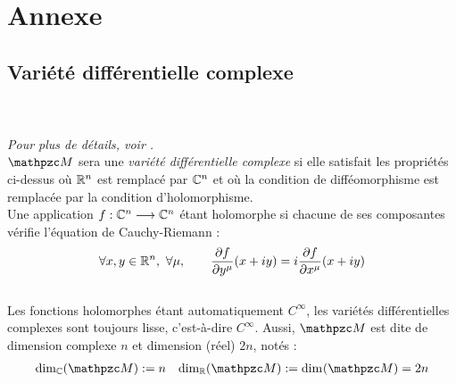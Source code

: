 \section{Annexe}

\subsection{\wip Variété différentielle complexe }\label{ann:VDC}

\\ \\
\textit{Pour plus de détails, voir \cite{nakahara_geometry_2003, ballmann_lectures_2006}.}
\\

$\manu$ sera une \emph{variété différentielle complexe} si elle satisfait les propriétés ci-dessus où $\mathbb{R}^n$ est remplacé par $\mathbb{C}^n$ et où la condition de difféomorphisme est remplacée par la condition d'holomorphisme. 
\\
Une application $f : \mathbb{C}^n\longrightarrow \mathbb{C}^n$ étant holomorphe si chacune de ses composantes vérifie l'équation de Cauchy-Riemann :
\[\forall x,y\in\R^n,\ \forall \mu,\qquad \frac{\partial f }{\partial y^\mu}(x+iy) = i \frac{\partial f }{\partial x^\mu}(x+iy)\]
\\
Les fonctions holomorphes étant automatiquement $C^\infty$, les variétés différentielles complexes sont toujours lisse, c'est-à-dire $C^\infty$. Aussi, $\manu$ est dite de dimension complexe $n$ et dimension (réel) $2n$, notés :
\begin{align}\label{eq:manuC-base_cano}
	\dim[\C](\manu) &\defeq n  &  \dim[\R] (\manu) \defeq \dim (\manu) = 2n
\end{align}
\\

